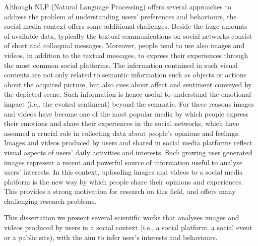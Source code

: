 Although NLP (Natural Language Processing) offers several approaches to address the problem of understanding users' preferences and behaviours, the social media context offers some additional challenges. Beside the huge amounts of available data, typically the textual communications on social networks consist of short and colloquial messages. Moreover, people tend to use also images and videos, in addition to the textual messages, to express their experiences through the most common social platforms.
The information contained in such visual contents are not only related to semantic information such as objects or actions about the acquired picture, but also cues about affect and sentiment conveyed by the depicted scene. Such information is hence useful to understand the emotional impact (i.e., the evoked sentiment) beyond the semantic.
For these reasons images and videos have become one of the most popular media by which people express their emotions and share their experiences in the social networks, which have assumed a crucial role in collecting data about people's opinions and feelings. 
Images and videos produced by users and shared in social media platforms reflect visual aspects of users' daily activities and interests. Such growing user generated images represent a recent and powerful source of information useful to analyse users' interests. 
In this context, uploading images and videos to a social media platform is the new way by which people share their opinions and experiences.  
This provides a strong motivation for research on this field, and offers many challenging research problems.

This dissertation we present several scientific works that analyses images and videos produced by users in a social context (i.e., a social platform, a social event or a public site), with the aim to infer user's interests and behaviours.


